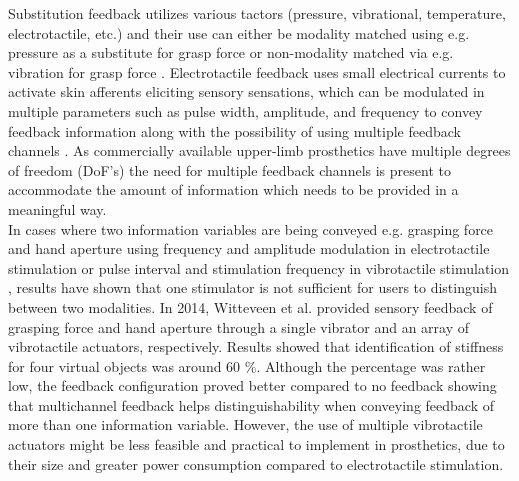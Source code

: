 Substitution feedback utilizes various tactors (pressure, vibrational, temperature, electrotactile, etc.) and their use can either be modality matched using e.g. pressure as a substitute for grasp force \cite{Godfrey2017} or non-modality matched via e.g. vibration for grasp force \cite{Ninu2014,Nabeel2016}. 
Electrotactile feedback uses small electrical currents to activate skin afferents eliciting sensory sensations, which can be modulated in multiple parameters such as pulse width, amplitude, and frequency to convey feedback information along with the possibility of using multiple feedback channels \cite{Geng2012}. As commercially available upper-limb prosthetics have multiple degrees of freedom (DoF's) \cite{Cordella2016} the need for multiple feedback channels is present to accommodate the amount of information which needs to be provided in a meaningful way. \\
%
In cases where two information variables are being conveyed e.g. grasping force and hand aperture using frequency and amplitude modulation in electrotactile stimulation \cite{Prior1976} or pulse interval and stimulation frequency in vibrotactile stimulation \cite{Chatterjee2008}, results have shown that one stimulator is not sufficient for users to distinguish between two modalities. In 2014, \cite{Witteveen2014} Witteveen et al. provided sensory feedback of grasping force and hand aperture through a single vibrator and an array of vibrotactile actuators, respectively. Results showed that identification of stiffness for four virtual objects was around 60 $\percent$. Although the percentage was rather low, the feedback configuration proved better compared to no feedback showing that multichannel feedback helps distinguishability when conveying feedback of more than one information variable. \cite{Witteveen2014} However, the use of multiple vibrotactile actuators might be less feasible and practical to implement in prosthetics, due to their size and greater power consumption compared to electrotactile stimulation.  \\
%
